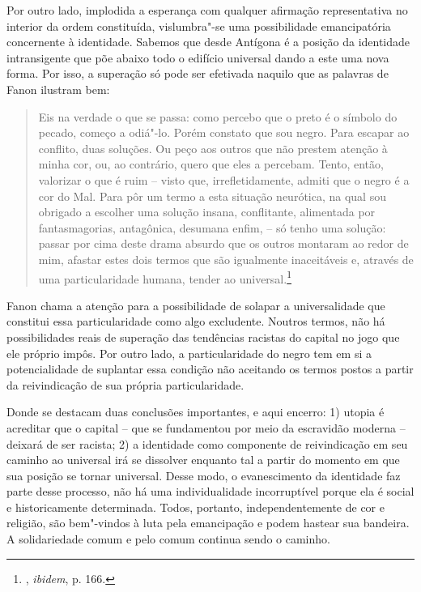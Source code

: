 Por outro lado, implodida a esperança com qualquer afirmação
representativa no interior da ordem constituída, vislumbra"-se uma
possibilidade emancipatória concernente à identidade. Sabemos que desde
Antígona é a posição da identidade intransigente que põe abaixo todo o
edifício universal dando a este uma nova forma. Por isso, a superação só
pode ser efetivada naquilo que as palavras de Fanon ilustram bem:

\begin{quote}
Eis na verdade o que se passa: como percebo que o preto é o símbolo do
pecado, começo a odiá"-lo. Porém constato que sou negro. Para escapar ao
conflito, duas soluções. Ou peço aos outros que não prestem atenção à
minha cor, ou, ao contrário, quero que eles a percebam. Tento, então,
valorizar o que é ruim -- visto que, irrefletidamente, admiti que o
negro é a cor do Mal. Para pôr um termo a esta situação neurótica, na
qual sou obrigado a escolher uma solução insana, conflitante, alimentada
por fantasmagorias, antagônica, desumana enfim, -- só tenho uma solução:
passar por cima deste drama absurdo que os outros montaram ao redor de
mim, afastar estes dois termos que são igualmente inaceitáveis e,
através de uma particularidade humana, tender ao universal.\footnote{,
  \emph{ibidem}, p. 166.}
\end{quote}

Fanon chama a atenção para a possibilidade de solapar a universalidade
que constitui essa particularidade como algo excludente. Noutros termos,
não há possibilidades reais de superação das tendências racistas do
capital no jogo que ele próprio impôs. Por outro lado, a particularidade
do negro tem em si a potencialidade de suplantar essa condição não
aceitando os termos postos a partir da reivindicação de sua própria
particularidade.

Donde se destacam duas conclusões importantes, e aqui encerro: 1) utopia
é acreditar que o capital -- que se fundamentou por meio da escravidão
moderna -- deixará de ser racista; 2) a identidade como componente de
reivindicação em seu caminho ao universal irá se dissolver enquanto tal
a partir do momento em que sua posição se tornar universal. Desse modo,
o evanescimento da identidade faz parte desse processo, não há uma
individualidade incorruptível porque ela é social e historicamente
determinada. Todos, portanto, independentemente de cor e religião, são
bem"-vindos à luta pela emancipação e podem hastear sua bandeira. A
solidariedade comum e pelo comum continua sendo o caminho.
